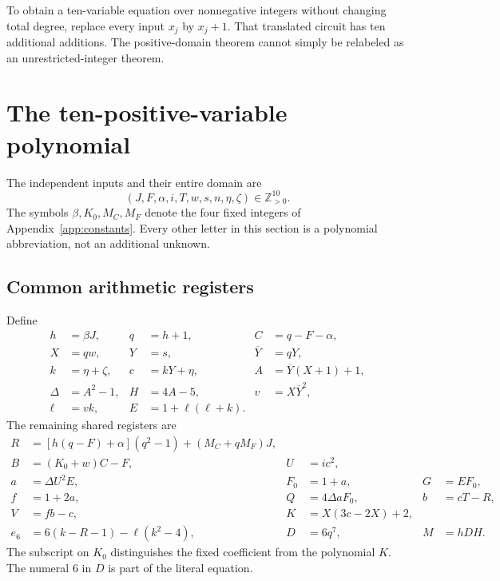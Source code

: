 \documentclass[11pt]{article}
\theoremstyle{remark}
\newcommand{\Zpos}{\mathbb Z_{>0}}
\newcommand{\yb}{\overline Y}
\begin{document}
To obtain a ten-variable equation over nonnegative integers without
changing total degree, replace every input \(x_j\) by \(x_j+1\).
That translated circuit has ten additional additions. The positive-domain
theorem cannot simply be relabeled as an unrestricted-integer theorem.

\section{The ten-positive-variable polynomial}\label{sec:equation}

The independent inputs and their entire domain are
\[
 (J,F,\alpha,i,T,w,s,n,\eta,\zeta)\in\Zpos^{10}.
\]
The symbols \(\beta,K_0,M_C,M_F\) denote the four fixed integers of
Appendix~\ref{app:constants}. Every other letter in this section is a
polynomial abbreviation, not an additional unknown.

\subsection{Common arithmetic registers}
Define
\begin{align}
 h&=\beta J,&q&=h+1,&C&=q-F-\alpha, \nonumber\\
 X&=qw,&Y&=s,&\yb&=qY, \nonumber\\
 k&=\eta+\zeta,&c&=kY+\eta,&
 A&=\yb(X+1)+1, \label{eq:front}\\
 \Delta&=A^2-1,&H&=4A-5,&v&=X\yb^2,\nonumber\\
 \ell&=vk,&E&=1+\ell(\ell+k).&&\nonumber
\end{align}
The remaining shared registers are
\begin{align}
 R&=[h(q-F)+\alpha](q^2-1)+(M_C+qM_F)J, \nonumber\\
 B&=(K_0+w)C-F,&U&=ic^2, \nonumber\\
 a&=\Delta U^2E,&F_0&=1+a,&G&=EF_0, \label{eq:pellregs}\\
 f&=1+2a,&Q&=4\Delta aF_0,&b&=cT-R,\nonumber\\
 V&=fb-c,&K&=X(3c-2X)+2,&&\nonumber\\
 e_6&=6(k-R-1)-\ell(k^2-4),&
 D&=6q^7,&M&=hDH.\nonumber
\end{align}
The subscript on \(K_0\) distinguishes the fixed coefficient from the
polynomial \(K\). The numeral \(6\) in \(D\) is part of the literal equation.
\end{document}

